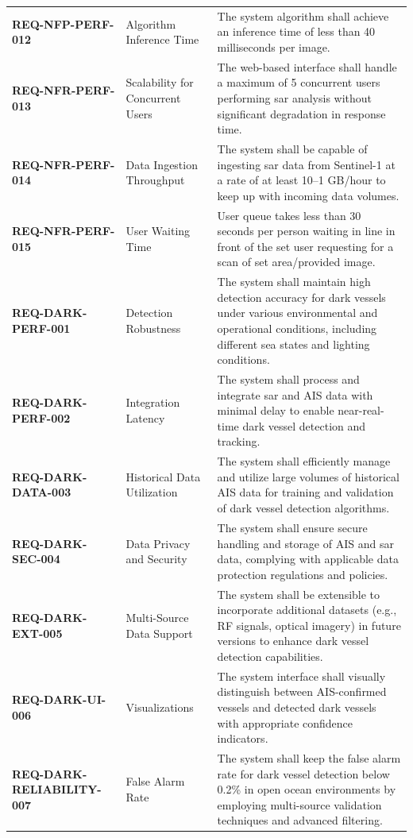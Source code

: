 \documentclass{article}
\begin{document}
\begin{longtable}{>{\bfseries}p{4.5cm}p{3.5cm}p{6.5cm}}
		REQ-NFP-PERF-012 & Algorithm Inference Time & The system algorithm shall achieve an inference time of less than 40 milliseconds per image. \\
		REQ-NFR-PERF-013 & Scalability for Concurrent Users & The web-based interface shall handle a maximum of 5 concurrent users performing \acrshort{sar} analysis without significant degradation in response time. \\
		REQ-NFR-PERF-014 & Data Ingestion Throughput & The system shall be capable of ingesting \acrshort{sar} data from Sentinel-1 at a rate of at least 10--1 GB/hour to keep up with incoming data volumes. \\
		REQ-NFR-PERF-015 & User Waiting Time & User queue takes less than 30 seconds per person waiting in line in front of the set user requesting for a scan of set area/provided image. \\
		REQ-DARK-PERF-001 & Detection Robustness & The system shall maintain high detection accuracy for dark vessels under various environmental and operational conditions, including different sea states and lighting conditions. \\
		REQ-DARK-PERF-002 & Integration Latency & The system shall process and integrate \acrshort{sar} and AIS data with minimal delay to enable near-real-time dark vessel detection and tracking. \\
		REQ-DARK-DATA-003 & Historical Data Utilization & The system shall efficiently manage and utilize large volumes of historical AIS data for training and validation of dark vessel detection algorithms. \\
		REQ-DARK-SEC-004 & Data Privacy and Security & The system shall ensure secure handling and storage of AIS and \acrshort{sar} data, complying with applicable data protection regulations and policies. \\
		REQ-DARK-EXT-005 & Multi-Source Data Support & The system shall be extensible to incorporate additional datasets (e.g., RF signals, optical imagery) in future versions to enhance dark vessel detection capabilities. \\
		REQ-DARK-UI-006 & Visualizations & The system interface shall visually distinguish between AIS-confirmed vessels and detected dark vessels with appropriate confidence indicators. \\
		REQ-DARK-RELIABILITY-007 & False Alarm Rate & The system shall keep the false alarm rate for dark vessel detection below 0.2\% in open ocean environments by employing multi-source validation techniques and advanced filtering. \\
	\end{longtable}
	
\end{document}
